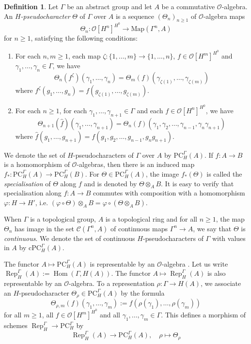 \documentclass{amsart}
\theoremstyle{definition}
\newtheorem{defi}[prop]{Definition}
\theoremstyle{remark}
\DeclareMathOperator{\Hom}{Hom}
\DeclareMathOperator{\Rep}{Rep}
\newcommand{\OO}{\mathcal O}
\newcommand{\PC}{\mathrm{PC}}
\newcommand{\cPC}{\mathrm{cPC}}
\newcommand{\Cont}{\mathcal C}
\begin{document}
\begin{defi}\label{LafPC} Let $\Gamma$ be an abstract group and let $A$ be a commutative $\OO$-algebra. An \emph{$H$-pseudocharacter} $\Theta$ of $\Gamma$ over $A$ is a sequence $(\Theta_n)_{n \geq 1}$ of $\OO$-algebra maps
$$\Theta_n : \OO[H^n]^{H^0} \to \mathrm{Map}(\Gamma^n,A)$$ for $n \geq 1$, satisfying the following conditions:
\begin{enumerate}
    \item For each $n,m \geq 1$, each map $\zeta : \{1, \dots, m\} \to \{1, \dots,n\}$, $f \in \OO[H^m]^{H^0}$ and $\gamma_1, \dots, \gamma_n \in \Gamma$, we have
    $$ \Theta_n(f^{\zeta})(\gamma_1, \dots, \gamma_n) = \Theta_m(f)(\gamma_{\zeta(1)}, \dots, \gamma_{\zeta(m)}) $$
    where $f^{\zeta}(g_1, \dots, g_n) = f(g_{\zeta(1)}, \dots, g_{\zeta(m)})$.
    \item For each $n \geq 1$, for each $\gamma_1, \dots, \gamma_{n+1} \in \Gamma$ and each $f \in \OO[H^n]^{H^0}$, we have
    $$ \Theta_{n+1}(\hat f)(\gamma_1, \dots, \gamma_{n+1}) = \Theta_n(f)(\gamma_1, \gamma_2, \dots, \gamma_{n-1}, \gamma_n\gamma_{n+1}) $$
    where $\hat f(g_1, \dots, g_{n+1}) = f(g_1, g_2, \dots, g_{n-1}, g_ng_{n+1})$.
\end{enumerate}
\end{defi}
We denote the set of $H$-pseudocharacters of $\Gamma$ over $A$ by $\PC_H^{\Gamma}(A)$.
If $f : A \to B$ is a homomorphism of $\OO$-algebras, then there is an induced map $f_* : \mathrm{PC}_{H}^{\Gamma}(A) \to \mathrm{PC}_{H}^{\Gamma}(B)$.
For $\Theta \in \mathrm{PC}_{H}^{\Gamma}(A)$, the image $f_*(\Theta)$ is called the \emph{specialisation} of $\Theta$ along $f$ and is denoted by $\Theta \otimes_A B$.
It is easy to verify that specialisation along $f : A \to B$ commutes with composition with a homomorphism $\varphi : H \to H'$, i.e. $(\varphi \circ \Theta) \otimes_A B = \varphi \circ (\Theta \otimes_A B)$.

When $\Gamma$ is a topological group, $A$ is a topological ring and for all $n \geq 1$, the map $\Theta_n$ has image in the set $\Cont(\Gamma^n, A)$ of continuous maps $\Gamma^n \to A$, we say that $\Theta$ is \emph{continuous}. We denote the set of continuous $H$-pseudocharacters of $\Gamma$ with values in $A$ by $\cPC_H^{\Gamma}(A)$.

The functor $A \mapsto \PC^{\Gamma}_H(A)$ is representable by an $\OO$-algebra \cite[Theorem 3.19]{quast}.
Let us write $\Rep^{\Gamma}_H(A) := \Hom(\Gamma, H(A))$.
The functor $A \mapsto \Rep^{\Gamma}_H(A)$ is also representable by an $\OO$-algebra.
To a representation $\rho : \Gamma \to H(A)$, we associate an $H$-pseudocharacter $\Theta_{\rho} \in \PC^{\Gamma}_H(A)$ by the formula
$$ \Theta_{\rho, m}(f)(\gamma_1, \dots, \gamma_m) := f(\rho(\gamma_1), \dots, \rho(\gamma_m))$$ 
for all $m \geq 1$, all $f \in \OO[H^m]^{H^0}$ and all $\gamma_1, \dots, \gamma_m \in \Gamma$.
This defines a morphism of schemes $\Rep^{\Gamma}_H \to \PC^{\Gamma}_H$ by
\begin{equation}\label{rep_to_pc}
    \Rep^{\Gamma}_H(A) \to \PC^{\Gamma}_H(A), \quad \rho \mapsto \Theta_{\rho} 
\end{equation}
\end{document}
